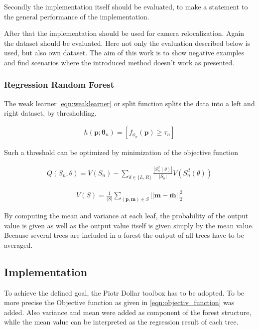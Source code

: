 Secondly the implementation itself should be evaluated, to make a statement to the general performance of the implementation.

After that the implementation should be used for camera relocalization. Again the dataset should be evaluated. Here not only the evaluation described below is used, but also own dataset. The aim of this work is to show negative examples and find scenarios where the introduced method \cite{shotton} doesn't work as presented.

\subsubsection{Regression Random Forest}
\label{rrf_intro}
The weak learner \ref{eqn:weaklearner} or split function splits the data into a left and right dataset, by thresholding.

\begin{eqnarray}\label{eqn:weaklearner}
  h(\mathbf{p};\mathbf{\theta}_n) = [ f_{\phi_n}(\mathbf{p}) \geq \tau_n ]
\end{eqnarray}

Such a threshold can be optimized by minimization of the objective function

\begin{eqnarray} \label{eqn:objectiv_function}
  Q(S_n,\theta) = V(S_n) - \sum_{d\in\{L,R\}}{\frac{|S_n^d(\theta)|}{|S_n|}V(S_n^d(\theta))}
\end{eqnarray}

\begin{eqnarray}
  V(S) = \frac{1}{|S|} \sum_{(\mathbf{p},\mathbf{m}) \in S}{||\mathbf{m} - \mathbf{\bar m}||_2^2}
\end{eqnarray}

By computing the mean and variance at each leaf, the probability of the output value is given as well as the output value itself is given simply by the mean value.
Because several trees are included in a forest the output of all trees have to be averaged.

\subsection{Implementation} %
\label{sub:implementation}
To achieve the defined goal, the Piotr Dollar toolbox \cite{piotr} has to be adopted. To be more precise the Objective function as given in \ref{eqn:objectiv_function} was added. Also variance and mean were added as component of the forest structure, while the mean value can be interpreted as the regression result of each tree.

